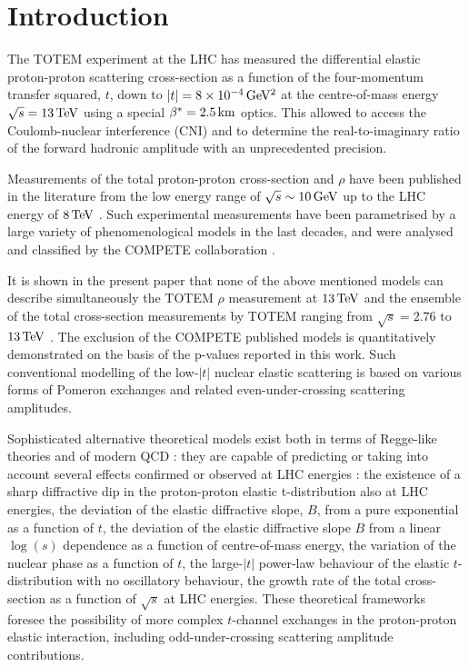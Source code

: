 \section{Introduction}
\label{sec:introduction}

The TOTEM experiment at the LHC has measured the differential elastic proton-proton scattering cross-section as a function of the four-momentum transfer squared, $t$, down to $|t| = 8\times10^{-4}\,{\rm GeV^2}$ at the centre-of-mass energy $\sqrt s = 13\,{\rm TeV}$ using a special $\beta^* = 2.5\,{\rm km}$ optics. This allowed to access the Coulomb-nuclear interference (CNI) and to determine the real-to-imaginary ratio of the forward hadronic amplitude with an unprecedented precision.

Measurements of the total proton-proton cross-section and $\rho$ have been published in the literature from the low energy range of $\sqrt s \sim 10\,{\rm GeV}$ up to the LHC energy of $8\,{\rm TeV}$ \cite{pdg-2016}. Such experimental measurements have been parametrised by a large variety of phenomenological models in the last decades, and were analysed and classified by the COMPETE collaboration \cite{compete}.

It is shown in the present paper that none of the above mentioned models can describe simultaneously the TOTEM $\rho$ measurement at $13\,{\rm TeV}$ and the ensemble of the total cross-section measurements by TOTEM ranging from $\sqrt s = 2.76$ to $13\,{\rm TeV}$ \cite{totem-7tev-tot2,totem-8tev-90m,totem-8tev-1km,totem-13tev-90m}. The exclusion of the COMPETE published models is quantitatively demonstrated on the basis of the p-values reported in this work. Such conventional modelling of the low-$|t|$ nuclear elastic scattering is based on various forms of Pomeron exchanges and related even-under-crossing scattering amplitudes.

Sophisticated alternative theoretical models exist both in terms of Regge-like theories \cite{nicolescu-1992} and of modern QCD \cite{braun}: they are capable of predicting or taking into account several effects confirmed or observed at LHC energies \cite{totem-7tev-first,totem-8tev-90m}: the existence of a sharp diffractive dip in the proton-proton elastic t-distribution also at LHC energies, the deviation of the elastic diffractive slope, $B$, from a pure exponential as a function of $t$, the deviation of the elastic diffractive slope $B$ from a linear $\log(s)$ dependence as a function of centre-of-mass energy, the variation of the nuclear phase as a function of $t$, the large-$|t|$ power-law behaviour of the elastic $t$-distribution with no oscillatory behaviour, the growth rate of the total cross-section as a function of $\sqrt s$ at LHC energies. These theoretical frameworks foresee the possibility of more complex $t$-channel exchanges in the proton-proton elastic interaction, including odd-under-crossing scattering amplitude contributions.

